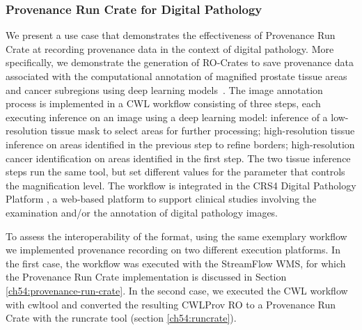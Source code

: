 \subsubsection{Provenance Run Crate for Digital Pathology}\label{ch54:provenance-run-crate-for-digital-pathology}

We present a use case that demonstrates the effectiveness of Provenance Run Crate at recording provenance data in the context of digital pathology.
More specifically, we demonstrate the generation of RO-Crates to save provenance data associated with the computational annotation of magnified prostate tissue areas and cancer subregions using deep learning models~\cite{Del Rio 2022}.
The image annotation process is implemented in a CWL workflow consisting of three steps, each executing inference on an image using a deep learning model: inference of a low-resolution tissue mask to select areas for further processing;
high-resolution tissue inference on areas identified in the previous step to refine borders; high-resolution cancer identification on areas identified in the first step.
The two tissue inference steps run the same tool, but set different values for the parameter that controls the magnification level.
The workflow is integrated in the CRS4 Digital Pathology Platform , a web-based platform to support clinical studies involving the examination and/or the annotation of digital pathology images.

To assess the interoperability of the format, using the same exemplary workflow we implemented provenance recording on two different execution platforms.
In the first case, the workflow was executed with the StreamFlow WMS, for which the Provenance Run Crate implementation is discussed in Section \vref{ch54:provenance-run-crate}.
In the second case, we executed the CWL workflow with cwltool and converted the resulting CWLProv RO to a Provenance Run Crate with the runcrate tool (section \vref{ch54:runcrate}).


